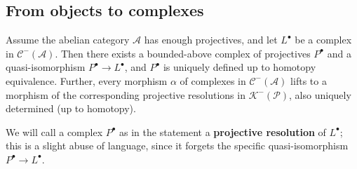 \subsection{From objects to complexes}
\begin{theorem}\label{proj reso exist}
Assume the abelian category $\mathcal{A}$ has enough projectives, and let $L^\bullet$ be a complex in $\mathcal{C}^-(\mathcal{A})$. Then there exists a bounded-above 
complex of projectives $P^\bullet$ and a quasi-isomorphism $P^\bullet\to L^\bullet$, and $P^\bullet$ is uniquely defined up to homotopy equivalence. Further, every 
morphism $\alpha$ of complexes in $\mathcal{C}^-(\mathcal{A})$ lifts to a morphism of the corresponding projective resolutions in $\mathcal{K}^-(\mathcal{P})$, also 
uniquely determined (up to homotopy).
\end{theorem}
We will call a complex $P^\bullet$ as in the statement a \textbf{projective resolution} of $L^\bullet$; this is a slight abuse of language, since it forgets the 
specific quasi-isomorphism $P^\bullet\to L^\bullet$.
